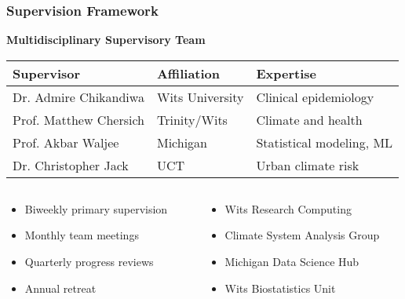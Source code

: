 \documentclass[aspectratio=169]{beamer}
\begin{document}
\begin{frame}
    \frametitle{Supervision Framework}
    
    \textbf{\large Multidisciplinary Supervisory Team}
    \begin{table}[h]
        \small
        \begin{tabular}{p{2.5cm}p{2.5cm}p{3.5cm}}
            \toprule
            \textbf{Supervisor} & \textbf{Affiliation} & \textbf{Expertise} \\
            \midrule
            Dr. Admire Chikandiwa & Wits University & Clinical epidemiology \\
            \addlinespace
            Prof. Matthew Chersich & Trinity/Wits & Climate and health \\
            \addlinespace
            Prof. Akbar Waljee & Michigan & Statistical modeling, ML \\
            \addlinespace
            Dr. Christopher Jack & UCT & Urban climate risk \\
            \bottomrule
        \end{tabular}
    \end{table}
    
    \vspace{0.3cm}
    \begin{columns}[T]
        \begin{column}{0.48\textwidth}
            \begin{infobox}
                \begin{itemize}[leftmargin=*, itemsep=4pt]
                    \item Biweekly primary supervision
                    \item Monthly team meetings
                    \item Quarterly progress reviews
                    \item Annual retreat
                \end{itemize}
            \end{infobox}
        \end{column}
        \begin{column}{0.48\textwidth}
            \begin{infobox}
                \begin{itemize}[leftmargin=*, itemsep=4pt]
                    \item Wits Research Computing
                    \item Climate System Analysis Group
                    \item Michigan Data Science Hub
                    \item Wits Biostatistics Unit
                \end{itemize}
            \end{infobox}
        \end{column}
    \end{columns}
\end{frame}
\end{document}
